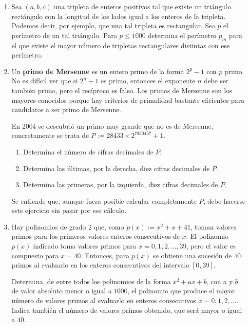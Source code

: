 \begin{enumerate}
\begin{enumerate}
\item  Sea $(a,b,c)$ una tripleta de enteros positivos tal que existe un triángulo rectángulo con la longitud de los lados igual a los enteros de la tripleta.  Podemos decir, por ejemplo, que una tal tripleta es rectangular. Sea $p$ el perímetro de un tal triángulo. Para $p\le 1000$ determina el perímetro $p_m$ para el que existe el mayor número de tripletas rectangulares distintas con ese perímetro. 

\item  Un {\bf primo de Mersenne} es un entero primo de la forma $2^p-1$ con $p$ primo. No es difícil ver que si $2^n-1$ es primo, entonces el exponente $n$ debe ser también primo, pero el recíproco es falso. Los primos de Mersenne son los mayores conocidos porque hay criterios de primalidad bastante eficientes para candidatos a ser primo de Mersenne. 

En 2004 se descubrió un primo muy grande que no es de Mersenne, concretamente se trata de $P:=28433\times 2^{7830457}+1$. 
\begin{enumerate}
\item  Determina el número de cifras decimales de $P$.

\item Determina las últimas, por la derecha, diez cifras decimales de $P$.

\item Determina las primeras, por la izquierda, diez cifras decimales de $P$. 
\end{enumerate}
Se entiende que,  aunque fuera posible calcular completamente $P$, debe hacerse este ejercicio sin pasar por ese cálculo.

\item  Hay polinomios de grado $2$ que, como $p(x):=x^2+x+41$, toman valores primos para los primeros valores enteros consecutivos de $x$.  El polinomio $p(x)$ indicado toma valores primos para $x=0,1,2,\dots,39$, pero el valor es compuesto para $x=40$. Entonces, para $p(x)$ se obtiene una sucesión de $40$ primos al evaluarlo en los enteros consecutivos del intervalo $[0,39].$

Determina, de entre todos los polinomios de la forma $x^2+ax+b$, con $a$ y $b$ de valor absoluto menor o igual a $1000$, el polinomio que produce el mayor número de valores primos al evaluarlo en enteros consecutivos $x=0,1,2,\dots$. Indica también el número de valores primos obtenido, que será mayor o igual a $40$.  











\end{enumerate}
\end{enumerate}
